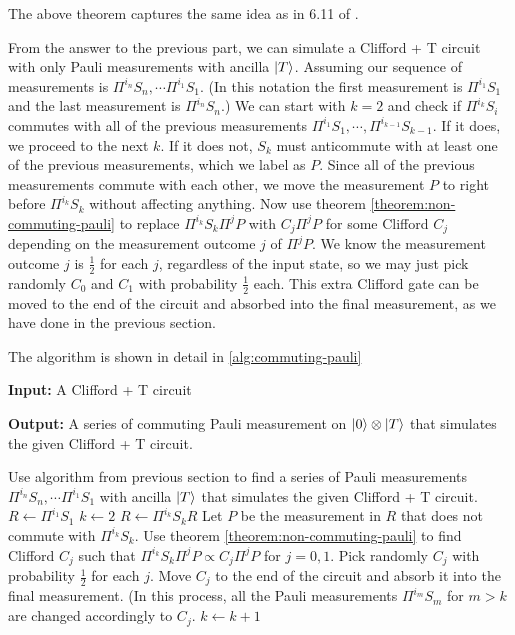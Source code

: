 The above theorem captures the same idea as in 6.11 of \cite{kissinger}.

From the answer to the previous part, we can simulate a Clifford + T circuit with only Pauli measurements with ancilla $|T\rangle$.
Assuming our sequence of measurements is $\Pi^{i_n}S_n, \cdots \Pi^{i_1}S_1$. (In this notation the first measurement is $\Pi^{i_1}S_1$ and the last measurement is $\Pi^{i_n}S_n$.)
We can start with $k = 2$ and check if $\Pi^{i_k} S_i$ commutes with all of the previous measurements $\Pi^{i_1}S_1, \cdots, \Pi^{i_{k-1}}S_{k-1}$.
If it does, we proceed to the next $k$. 
If it does not, $S_k$ must anticommute with at least one of the previous measurements, which we label as $P$.
Since all of the previous measurements commute with each other, we move the measurement $P$ to right before $\Pi^{i_k} S_k$ without affecting anything.
Now use theorem \ref{theorem:non-commuting-pauli} to replace $\Pi^{i_k} S_k \Pi^j P$ with $C_j \Pi^j P$ for some Clifford $C_j$ depending on the measurement outcome $j$ of $\Pi^j P$. We know the measurement outcome $j$ is $\frac{1}{2}$ for each $j$, regardless of the input state, so we may just pick randomly $C_0$ and $C_1$ with probability $\frac{1}{2}$ each.
This extra Clifford gate can be moved to the end of the circuit and absorbed into the final measurement, as we have done in the previous section.

The algorithm is shown in detail in \ref{alg:commuting-pauli}

\begin{algorithm}\label{alg:commuting-pauli}
	\caption{Cliffort + T with commuting Pauli measurements}
	\hspace*{\algorithmicindent} \textbf{Input:} A Clifford + T circuit 

	\hspace*{\algorithmicindent} \textbf{Output:} A series of commuting Pauli measurement on $|0\rangle \otimes |T\rangle$ that simulates the given Clifford + T circuit.
\begin{algorithmic}[1]
	\State Use algorithm from previous section to find a series of Pauli measurements $\Pi^{i_n}S_n, \cdots \Pi^{i_1}S_1$ with ancilla $|T\rangle$ that simulates the given Clifford + T circuit.
	\State $R \gets \Pi^{i_1} S_1$ 
	\State $k \gets 2$
		\State $R \gets \Pi^{i_k} S_k R$
	\Else
	\State Let $P$ be the measurement in $R$ that does not commute with $\Pi^{i_k} S_k$.
	\State Use theorem \ref{theorem:non-commuting-pauli} to find Clifford $C_j$ such that $\Pi^{i_k} S_k \Pi^j P \propto C_j \Pi^j P$ for $j = 0, 1$.
	\State Pick randomly $C_j$ with probability $\frac{1}{2}$ for each $j$.
	\State Move $C_j$ to the end of the circuit and absorb it into the final measurement. (In this process, all the Pauli measurements $\Pi^{i_{m}} S_m$ for $m > k$ are changed accordingly to $C_j$.
	\EndIf
	\State $k \gets k + 1$
	\EndWhile 
\end{algorithmic}
\end{algorithm}

